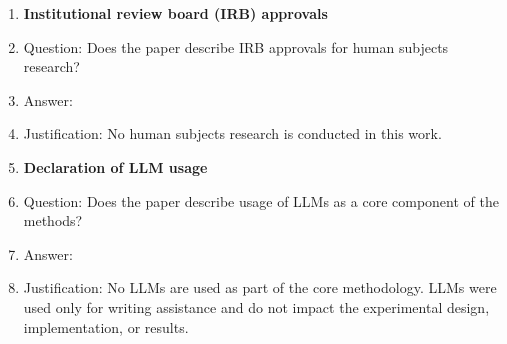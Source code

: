 \documentclass{article}
\begin{document}
\begin{enumerate}
\item \textbf{Institutional review board (IRB) approvals}
  \item[] Question: Does the paper describe IRB approvals for human subjects research?
  \item[] Answer: \answerNA{}
  \item[] Justification: No human subjects research is conducted in this work.

\item \textbf{Declaration of LLM usage}
  \item[] Question: Does the paper describe usage of LLMs as a core component of the methods?
  \item[] Answer: \answerNA{}
  \item[] Justification: No LLMs are used as part of the core methodology. LLMs were used
  only for writing assistance and do not impact the experimental design, implementation, or
  results.

\end{enumerate}
\end{document}
